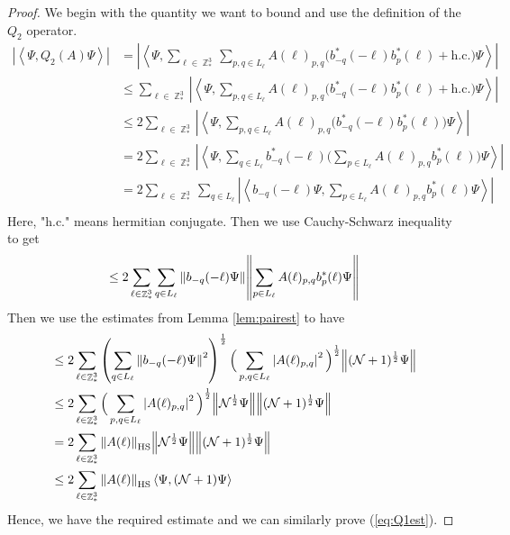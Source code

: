 \documentclass[sn-mathphys, Numbered ,a4paper]{sn-jnl}%
\DeclareMathOperator{\Z}{\mathbb{Z}}
\newcommand{\half}{\frac{1}{2}}
\newcommand{\eva}[1]{\left\langle #1 \right\rangle}
\theoremstyle{plain}
\theoremstyle{definition}
\theoremstyle{remark}
\theoremstyle{plain}
\theoremstyle{definition}
\theoremstyle{remark}
\begin{document}
\begin{proof}
    We begin with the quantity we want to bound and use the definition of the $Q_2$ operator.
    \begin{align}
        |\eva{\Psi,Q_2(A)\Psi}|&=\left|\eva{\Psi,\sum\limits_{\ell\in \Z^3_*}\sum\limits_{p,q\in L_{\ell}}A(\ell)_{p,q}\big(b_{-q}^*(-\ell)b_p^*(\ell)+\mathrm{h.c.}\big)\Psi}\right|\nonumber \\
        &\leq \sum\limits_{\ell\in \Z^3_*}\left|\eva{\Psi,\sum\limits_{p,q\in L_{\ell}}A(\ell)_{p,q}\big(b_{-q}^*(-\ell)b_p^*(\ell)+\mathrm{h.c.}\big)\Psi}\right|\nonumber\\
        &\leq 2\sum\limits_{\ell\in \Z^3_*}\left|\eva{\Psi,\sum\limits_{p,q\in L_{\ell}}A(\ell)_{p,q}\big(b_{-q}^*(-\ell)b_p^*(\ell)\big)\Psi}\right|\nonumber\\
        &=2\sum\limits_{\ell\in \Z^3_*}\left|\eva{\Psi,\sum\limits_{q\in L_{\ell}}b^*_{-q}(-\ell)\Big(\sum\limits_{p\in L_{\ell}}A(\ell)_{p,q}b_p^*(\ell)\Big)\Psi}\right|\nonumber\\
        &=2\sum\limits_{\ell\in \Z^3_*}\sum\limits_{q\in L_{\ell}}\left|\eva{b_{-q}(-\ell)\Psi,\sum\limits_{p\in L_{\ell}}A(\ell)_{p,q}b_p^*(\ell) \Psi}\right|\nonumber\\
    \end{align}
	Here, "h.c." means hermitian conjugate.
    Then we use Cauchy-Schwarz inequality to get
    \begin{equation}
        \leq 2\sum\limits_{\ell\in \Z^3_*}\sum\limits_{q\in L_{\ell}} \norm{b_{-q}(-\ell)\Psi}\norm{\sum\limits_{p\in L_{\ell}} A(\ell)_{p,q}b^*_{p}(\ell)\Psi}
    \end{equation}
    Then we use the estimates from Lemma \ref{lem:pairest} to have
    \begin{align}
        &\leq 2\sum\limits_{\ell\in \Z^3_*} \left(\sum\limits_{q\in L_{\ell}} \norm{b_{-q}(-\ell)\Psi}^2\right)^\half \Big(\sum\limits_{p,q\in L_{\ell}}\left|A(\ell)_{p,q}\right|^2\Big)^\half \norm{(\mathcal{N}+1)^\half \Psi}\nonumber\\
        &\leq 2\sum\limits_{\ell\in \Z^3_*} \Big(\sum\limits_{p,q\in L_{\ell}}\left|A(\ell)_{p,q}\right|^2\Big)^\half \norm{\mathcal{N}^\half \Psi}\norm{(\mathcal{N}+1)^\half \Psi}\nonumber\\
        &= 2\sum\limits_{\ell\in \Z^3_*}\norm{A(\ell)}_{\mathrm{HS}}\norm{\mathcal{N}^\half \Psi}\norm{(\mathcal{N}+1)^\half \Psi}\nonumber\\
        &\leq 2\sum\limits_{\ell\in \Z^3_*}\norm{A(\ell)}_{\mathrm{HS}}\eva{\Psi,(\mathcal{N}+1) \Psi}
    \end{align}
    Hence, we have the required estimate and we can similarly prove (\ref{eq:Q1est}). 
\end{proof}
\end{document}
